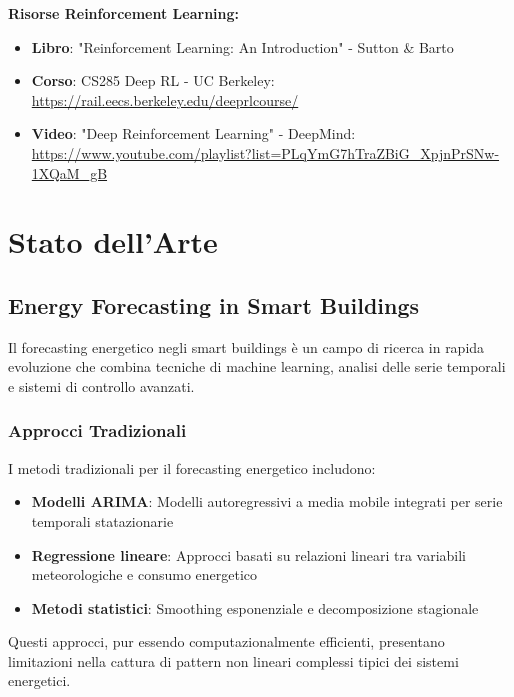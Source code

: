 \documentclass[12pt,a4paper,twoside]{report}
\begin{document}
\textbf{Risorse Reinforcement Learning:}
\begin{itemize}
    \item \textbf{Libro}: "Reinforcement Learning: An Introduction" - Sutton \& Barto
    \item \textbf{Corso}: CS285 Deep RL - UC Berkeley: \url{https://rail.eecs.berkeley.edu/deeprlcourse/}
    \item \textbf{Video}: "Deep Reinforcement Learning" - DeepMind: \url{https://www.youtube.com/playlist?list=PLqYmG7hTraZBiG_XpjnPrSNw-1XQaM_gB}
\end{itemize}


\chapter{Stato dell'Arte}

\section{Energy Forecasting in Smart Buildings}

Il forecasting energetico negli smart buildings è un campo di ricerca in rapida evoluzione che combina tecniche di machine learning, analisi delle serie temporali e sistemi di controllo avanzati.

\subsection{Approcci Tradizionali}

I metodi tradizionali per il forecasting energetico includono:

\begin{itemize}
    \item \textbf{Modelli ARIMA}: Modelli autoregressivi a media mobile integrati per serie temporali statazionarie
    \item \textbf{Regressione lineare}: Approcci basati su relazioni lineari tra variabili meteorologiche e consumo energetico
    \item \textbf{Metodi statistici}: Smoothing esponenziale e decomposizione stagionale
\end{itemize}

Questi approcci, pur essendo computazionalmente efficienti, presentano limitazioni nella cattura di pattern non lineari complessi tipici dei sistemi energetici.
\end{document}
